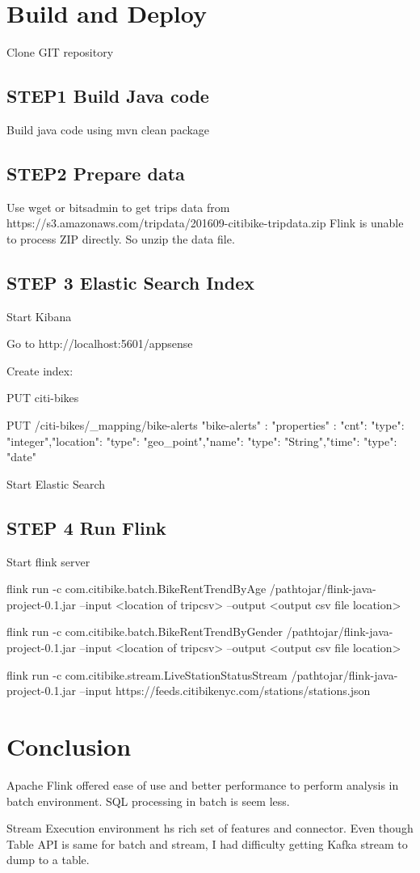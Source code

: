 \documentclass{sig-alternate-05-2015}
\begin{document}
\section {Build and Deploy}

Clone GIT repository

\subsection {STEP1 Build Java code}
Build java code using \break
mvn clean package

\subsection {STEP2 Prepare data}
Use wget or bitsadmin to get trips data from 
https://s3.amazonaws.com/tripdata/201609-citibike-tripdata.zip
\break
Flink is unable to process ZIP directly. So unzip the data file.


\subsection {STEP 3 Elastic Search Index}
Start Kibana

Go to http://localhost:5601/appsense

Create index:

PUT citi-bikes


PUT /citi-bikes/_mapping/bike-alerts
{"bike-alerts" : {"properties" : {"cnt": {"type": "integer"},"location": {"type": "geo_point"},"name": {"type": "String"},"time": {"type": "date"}}}}

Start Elastic Search


\subsection {STEP 4 Run Flink}
Start flink server 

flink run -c com.citibike.batch.BikeRentTrendByAge /pathtojar/flink-java-project-0.1.jar --input <location of tripcsv> --output <output csv file location>

flink run -c com.citibike.batch.BikeRentTrendByGender /pathtojar/flink-java-project-0.1.jar --input <location of tripcsv> --output <output csv file location>

flink run -c com.citibike.stream.LiveStationStatusStream /pathtojar/flink-java-project-0.1.jar --input https://feeds.citibikenyc.com/stations/stations.json

\section {Conclusion}
Apache Flink offered ease of use and better performance to perform analysis in batch environment. SQL processing in batch is seem less.

Stream Execution environment hs rich set of features and connector. Even though Table API is same for batch and stream, I had difficulty getting Kafka stream to dump to a table.   
\end{document}
